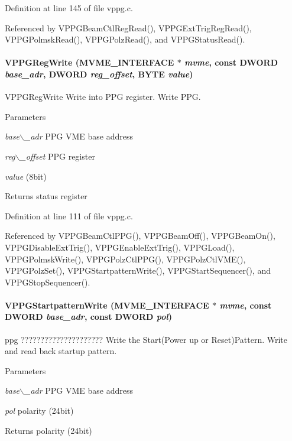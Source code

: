 Definition at line 145 of file vppg.c.

Referenced by VPPGBeamCtlRegRead(), VPPGExtTrigRegRead(), VPPGPolmskRead(), VPPGPolzRead(), and VPPGStatusRead().
\paragraph[{VPPGRegWrite}]{ VPPGRegWrite ({\bf MVME\_\-INTERFACE} $\ast$ {\em mvme}, \/  const {\bf DWORD} {\em base\_\-adr}, \/  {\bf DWORD} {\em reg\_\-offset}, \/  {\bf BYTE} {\em value})}\hfill\label{vppg_8c_a4f6ab8a9fcc14540cbd36f5d9313e8e8}
VPPGRegWrite Write into PPG register.  Write PPG. 
\begin{DoxyParams}{Parameters}
\item[{\em base$\backslash$\_\-adr}]PPG VME base address \item[{\em reg$\backslash$\_\-offset}]PPG register \item[{\em value}](8bit) \end{DoxyParams}
\begin{DoxyReturn}{Returns}
status register 
\end{DoxyReturn}


Definition at line 111 of file vppg.c.

Referenced by VPPGBeamCtlPPG(), VPPGBeamOff(), VPPGBeamOn(), VPPGDisableExtTrig(), VPPGEnableExtTrig(), VPPGLoad(), VPPGPolmskWrite(), VPPGPolzCtlPPG(), VPPGPolzCtlVME(), VPPGPolzSet(), VPPGStartpatternWrite(), VPPGStartSequencer(), and VPPGStopSequencer().
\paragraph[{VPPGStartpatternWrite}]{ VPPGStartpatternWrite ({\bf MVME\_\-INTERFACE} $\ast$ {\em mvme}, \/  const {\bf DWORD} {\em base\_\-adr}, \/  const {\bf DWORD} {\em pol})}\hfill\label{vppg_8c_a767e059079431674f2649671ec2b72c1}
ppg ????????????????????? Write the Start(Power up or Reset)Pattern.  Write and read back startup pattern. 
\begin{DoxyParams}{Parameters}
\item[{\em base$\backslash$\_\-adr}]PPG VME base address \item[{\em pol}]polarity (24bit) \end{DoxyParams}
\begin{DoxyReturn}{Returns}
polarity (24bit) 
\end{DoxyReturn}


